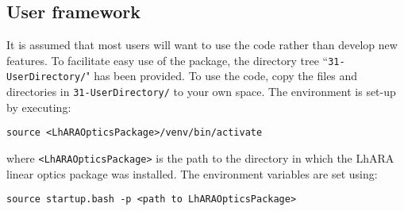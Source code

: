 \subsection*{User framework}
It is assumed that most users will want to use the code rather than
develop new features.
To facilitate easy use of the package, the directory tree
``\verb+31-UserDirectory/+" has been provided.
To use the code, copy the files and directories in
\verb+31-UserDirectory/+ to your own space.
The environment is set-up by executing:
\begin{center}
  \verb+source <LhARAOpticsPackage>/venv/bin/activate+
\end{center}
where \verb+<LhARAOpticsPackage>+ is the path to the directory in
which the LhARA linear optics package was installed.
The environment variables are set using:
\begin{center}
  \verb+source startup.bash -p <path to LhARAOpticsPackage>+
\end{center}

